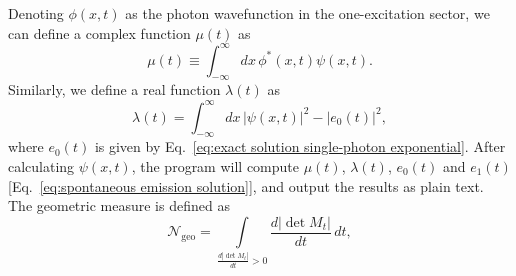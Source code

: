 \documentclass[final,1p,times]{elsarticle}
\begin{document}
Denoting $\phi(x, t)$ as the photon wavefunction in the one-excitation sector, 
we can define a complex function $\mu(t)$ as
\begin{equation}
\mu(t) \equiv \int_{-\infty}^{\infty}dx\, \phi^*(x, t) \psi(x, t). %
\label{eq:mu}
\end{equation}
Similarly, we define a real function $\lambda(t)$ as
\begin{equation}
\lambda(t) = \int_{-\infty}^{\infty}dx\, |\psi(x, t)|^2 - |e_0(t)|^2, %
\label{eq:lambda}
\end{equation}
where $e_0(t)$ is given by Eq.~\eqref{eq:exact solution single-photon exponential}.
After calculating $\psi(x,t)$, the program will compute $\mu(t)$, $\lambda(t)$, $e_0(t)$ and $e_1(t)$ [Eq.~\eqref{eq:spontaneous emission solution}], and output the results as plain text. 
The geometric measure is defined as \cite{LorenzoPRA13}
\begin{equation}
\mathcal{N}_\text{geo}=\int\limits_{\frac{d|\det M_t|}{dt}>0} \frac{d|\det M_t|}{dt}\,dt,
\label{eq: geo measure}
\end{equation}
\end{document}
